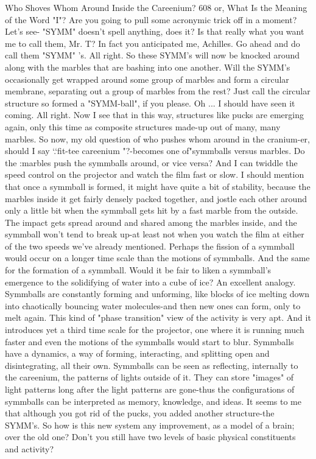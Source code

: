 Who Shoves Whom Around Inside the Careenium?                                           608
or, What Is the Meaning of the Word "I"?
\achilles Are you going to pull some acronymic trick off in a moment? Let's see-
  "SYMM" doesn't spell anything, does it? Is that really what you want me to call
  them, Mr. T?
\tortoise In fact you anticipated me, Achilles. Go ahead and do call them
  "SYMM" 's.
\achilles All right. So these SYMM's will now be knocked around along with the
  marbles that are bashing into one another. Will the SYMM's occasionally get
  wrapped around some group of marbles and form a circular membrane, separating
  out a group of marbles from the rest?
\tortoise Just call the circular structure so formed a "SYMM-ball", if you please.
\achilles Oh ... I should have seen it coming. All right. Now I see that in this way,
  structures like pucks are emerging again, only this time as composite structures
  made-up out of many, many marbles. So now, my old question of who pushes
  whom around in the cranium-er, should I say `.`fit-tee careenium "?-becomes one
  of"symmballs versus marbles. Do the :marbles push the symmballs around, or vice
  versa? And I can twiddle the speed control on the projector and watch the film fast
  or slow.
\tortoise I should mention that once a symmball is formed, it might have quite a
  bit of stability, because the marbles inside it get fairly densely packed together, and
  jostle each other around only a little bit when the symmball gets hit by a fast
  marble from the outside. The impact gets spread around and shared among the
  marbles inside, and the symmball won't tend to break up-at least not when you
  watch the film at either of the two speeds we've already mentioned. Perhaps the
  fission of a symmball would occur on a longer time scale than the motions of
  symmballs. And the same for the formation of a symmball.
\achilles Would it be fair to liken a symmball's emergence to the solidifying of
  water into a cube of ice?
\tortoise An excellent analogy. Symmballs are constantly forming and unforming,
  like blocks of ice melting down into chaotically bouncing water molecules-and
  then new ones can form, only to melt again. This kind of "phase transition" view of
  the activity is very apt. And it introduces yet a third time scale for the projector,
  one where it is running much faster and even the motions of the symmballs would
  start to blur. Symmballs have a dynamics, a way of forming, interacting, and
  splitting open and disintegrating, all their own. Symmballs can be seen as
  reflecting, internally to the careenium, the patterns of lights outside of it. They can
  store "images" of light patterns long after the light patterns are gone-thus the
  configurations of symmballs can be interpreted as memory, knowledge, and ideas.
\achilles It seems to me that although you got rid of the pucks, you added another
  structure-the SYMM's. So how is this new system any improvement, as a model of
  a brain; over the old one? Don't you still have two levels of basic physical
  constituents and activity?




